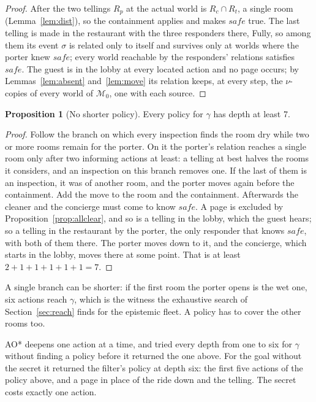 \documentclass[11pt,a4paper]{article}
\theoremstyle{definition}
\newtheorem{proposition}{Proposition}
\newcommand{\Mod}{\mathcal{M}}
\newcommand{\safe}{\mathit{safe}}
\begin{document}
\begin{proof}
After the two tellings $R_p$ at the actual world is $R_c \cap R_t$, a single room
(Lemma~\ref{lem:dist}), so the containment applies and makes $\safe$ true. The
last telling is made in the restaurant with the three responders there, Fully,
so among them its event $\sigma$ is related only to itself and survives only at
worlds where the porter knew $\safe$; every world reachable by the responders'
relations satisfies $\safe$. The guest is in the lobby at every located action
and no page occurs; by Lemmas~\ref{lem:absent} and~\ref{lem:move} its relation
keeps, at every step, the $\nu$-copies of every world of $\Mod_0$, one with
each source.
\end{proof}

\begin{proposition}[No shorter policy]
\label{prop:depth}
Every policy for $\gamma$ has depth at least 7.
\end{proposition}

\begin{proof}
Follow the branch on which every inspection finds the room dry while two or more
rooms remain for the porter. On it the porter's relation reaches a single room
only after two informing actions at least: a telling at best halves the rooms it
considers, and an inspection on this branch removes one. If the last of them is
an inspection, it was of another room, and the porter moves again before the
containment. Add the move to the room and the containment. Afterwards the
cleaner and the concierge must come to know $\safe$. A page is excluded by
Proposition~\ref{prop:allclear}, and so is a telling in the lobby, which the
guest hears; so a telling in the restaurant by the porter, the only responder
that knows $\safe$, with both of them there. The porter moves down to it, and the
concierge, which starts in the lobby, moves there at some point. That is at
least $2 + 1 + 1 + 1 + 1 + 1 = 7$.
\end{proof}

A single branch can be shorter: if the first room the porter opens is the wet
one, six actions reach $\gamma$, which is the witness the exhaustive search of
Section~\ref{sec:reach} finds for the epistemic fleet. A policy has to cover the
other rooms too.

AO* deepens one action at a time, and tried every depth from one to six for
$\gamma$ without finding a policy before it returned the one above. For the goal
without the secret it returned the filter's policy at depth six: the first five actions of the
policy above, and a page in place of the ride down and the telling. The secret
costs exactly one action.
\end{document}
